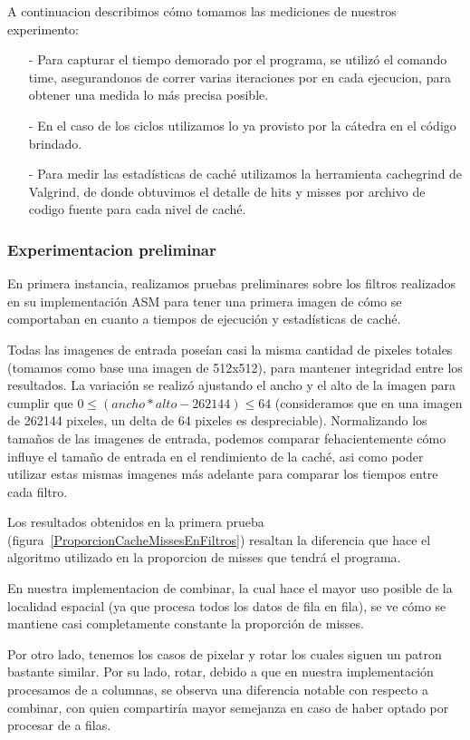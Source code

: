 \documentclass[a4paper]{article}
\begin{document}
A continuacion describimos cómo tomamos las mediciones de nuestros experimento:
\begin{itemize}
    \itemsep0em
    \item[-]
        Para capturar el tiempo demorado por el programa, se utilizó el comando time, asegurandonos de correr varias iteraciones por en cada ejecucion, para obtener una medida lo más precisa posible.
    \item[-]
        En el caso de los ciclos utilizamos lo ya provisto por la cátedra en el código brindado.
    \item[-]
        Para medir las estadísticas de caché utilizamos la herramienta cachegrind de Valgrind, de donde obtuvimos el detalle de hits y misses por archivo de codigo fuente para cada nivel de caché.
\end{itemize}

\subsubsection*{Experimentacion preliminar}

En primera instancia, realizamos pruebas preliminares sobre los filtros realizados en su implementación ASM para tener una primera imagen de cómo se comportaban en cuanto a tiempos de ejecución y estadísticas de caché. 

Todas las imagenes de entrada poseían casi la misma cantidad de pixeles totales (tomamos como base una imagen de 512x512), para mantener integridad entre los resultados. La variación se realizó ajustando el ancho y el alto de la imagen para cumplir que $0 \leq (ancho * alto - 262144) \leq 64$ (consideramos que en una imagen de 262144 pixeles, un delta de 64 pixeles es despreciable). Normalizando los tamaños de las imagenes de entrada, podemos comparar fehacientemente cómo influye el tamaño de entrada en el rendimiento de la caché, asi como poder utilizar estas mismas imagenes más adelante para comparar los tiempos entre cada filtro.

Los resultados obtenidos en la primera prueba (figura~\ref{ProporcionCacheMissesEnFiltros}) resaltan la diferencia que hace el algoritmo utilizado en la proporcion de misses que tendrá el programa. 

En nuestra implementacion de combinar, la cual hace el mayor uso posible de la localidad espacial (ya que procesa todos los datos de fila en fila), se ve cómo se mantiene casi completamente constante la proporción de misses. 

Por otro lado, tenemos los casos de pixelar y rotar los cuales siguen un patron bastante similar. Por su lado, rotar, debido a que en nuestra implementación procesamos de a columnas, se observa una diferencia notable con respecto a combinar, con quien compartiría mayor semejanza en caso de haber optado por procesar de a filas.
\end{document}

